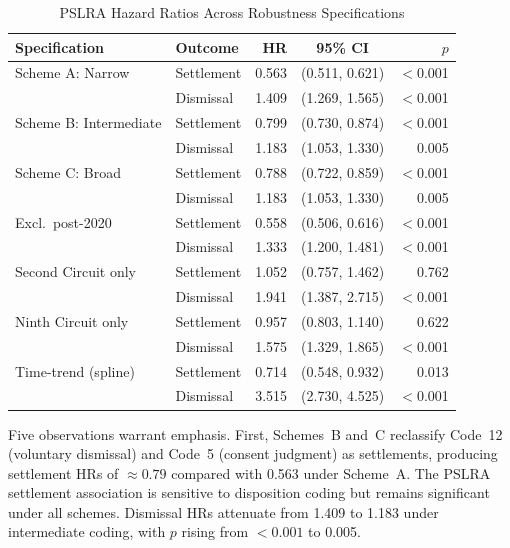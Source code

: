 \begin{table}[htbp]
\centering
\caption{PSLRA Hazard Ratios Across Robustness Specifications}
\label{tab:robustness}
\renewcommand{\arraystretch}{1.2}
\begin{tabular*}{\textwidth}{@{\extracolsep{\fill}} l l r c r @{}}
\toprule
\textbf{Specification} & \textbf{Outcome} & \textbf{HR} & \textbf{95\% CI} & \textbf{$p$} \\
\midrule
Scheme A: Narrow        & Settlement & 0.563 & (0.511, 0.621) & $<$0.001 \\
                        & Dismissal  & 1.409 & (1.269, 1.565) & $<$0.001 \\
\addlinespace[0.5em]
Scheme B: Intermediate  & Settlement & 0.799 & (0.730, 0.874) & $<$0.001 \\
                        & Dismissal  & 1.183 & (1.053, 1.330) & 0.005 \\
\addlinespace[0.5em]
Scheme C: Broad          & Settlement & 0.788 & (0.722, 0.859) & $<$0.001 \\
                        & Dismissal  & 1.183 & (1.053, 1.330) & 0.005 \\
\addlinespace[0.5em]
Excl.\ post-2020        & Settlement & 0.558 & (0.506, 0.616) & $<$0.001 \\
                        & Dismissal  & 1.333 & (1.200, 1.481) & $<$0.001 \\
\addlinespace[0.5em]
Second Circuit only     & Settlement & 1.052 & (0.757, 1.462) & 0.762    \\
                        & Dismissal  & 1.941 & (1.387, 2.715) & $<$0.001 \\
\addlinespace[0.5em]
Ninth Circuit only      & Settlement & 0.957 & (0.803, 1.140) & 0.622    \\
                        & Dismissal  & 1.575 & (1.329, 1.865) & $<$0.001 \\
\addlinespace[0.5em]
Time-trend (spline)     & Settlement & 0.714 & (0.548, 0.932) & 0.013    \\
                        & Dismissal  & 3.515 & (2.730, 4.525) & $<$0.001 \\
\bottomrule
\end{tabular*}
\end{table}

Five observations warrant emphasis. First, Schemes~B and~C
reclassify Code~12 (voluntary dismissal) and Code~5 (consent
judgment) as settlements, producing settlement HRs of
$\approx 0.79$ compared with 0.563 under Scheme~A. The
PSLRA settlement association is sensitive to disposition
coding but remains significant under all schemes.
Dismissal HRs attenuate from 1.409 to 1.183 under intermediate
coding, with $p$ rising from $< 0.001$ to 0.005.

